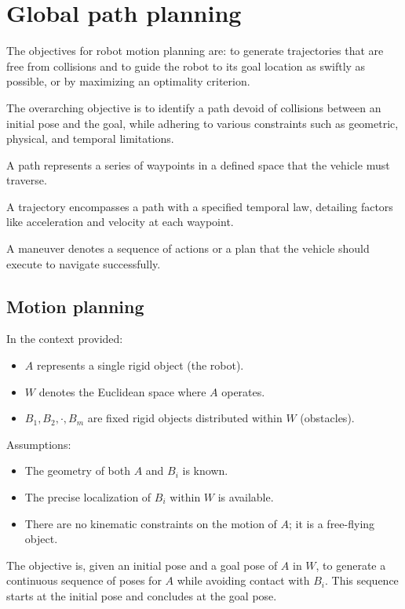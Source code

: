\section{Global path planning}

The objectives for robot motion planning are: to generate trajectories that are free from collisions and to guide the robot to its goal location as swiftly as possible, or by maximizing an optimality criterion.

The overarching objective is to identify a path devoid of collisions between an initial pose and the goal, while adhering to various constraints such as geometric, physical, and temporal limitations.
\begin{definition}
    A path represents a series of waypoints in a defined space that the vehicle must traverse.
\end{definition}
\begin{definition}
    A trajectory encompasses a path with a specified temporal law, detailing factors like acceleration and velocity at each waypoint.
\end{definition}
\begin{definition}
    A maneuver denotes a sequence of actions or a plan that the vehicle should execute to navigate successfully.
\end{definition}

\subsection{Motion planning}
In the context provided:
\begin{itemize}
    \item $A$ represents a single rigid object (the robot).
    \item $W$ denotes the Euclidean space where $A$ operates.
    \item $B_1,B_2,\cdot,B_m$ are fixed rigid objects distributed within $W$ (obstacles).
\end{itemize}
Assumptions:
\begin{itemize}
    \item The geometry of both $A$ and $B_i$ is known.
    \item The precise localization of $B_i$ within $W$ is available.
    \item There are no kinematic constraints on the motion of $A$; it is a free-flying object.
\end{itemize}
The objective is, given an initial pose and a goal pose of $A$ in $W$, to generate a continuous sequence of poses for $A$ while avoiding contact with $B_i$. 
This sequence starts at the initial pose and concludes at the goal pose.

